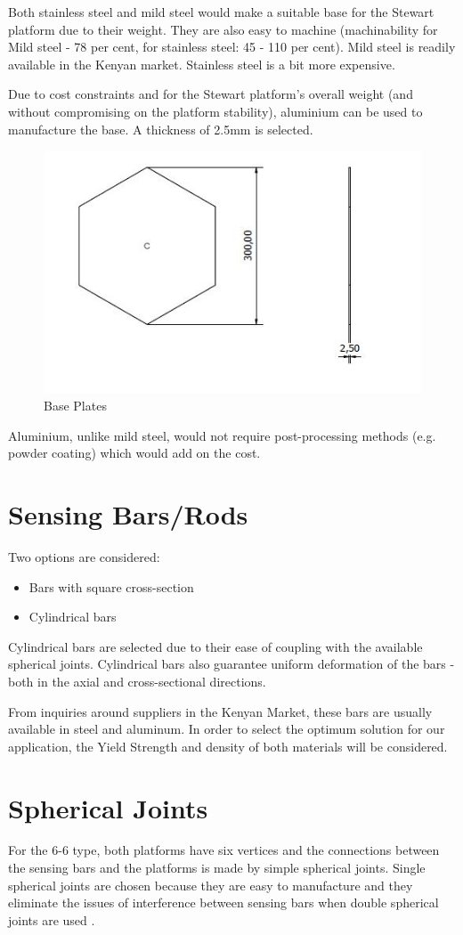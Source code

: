 Both stainless steel and mild steel would make a suitable base for the Stewart platform due to their weight. They are also easy to machine (machinability for Mild steel - 78 per cent, for stainless steel: 45 - 110 per cent). Mild steel is readily available in the Kenyan market. Stainless steel is a bit more expensive.

Due to cost constraints and for the Stewart platform's overall weight (and without compromising on the platform stability), aluminium can be used to manufacture the base. A thickness of 2.5mm is selected.
\begin{center}
	\begin{figure}[!h]
	\centering
	\includegraphics[width=0.6\linewidth]{Figures/Base}
	\caption[Base Plates]{Base Plates}
	\end{figure}
\end{center}
Aluminium, unlike mild steel, would not require post-processing methods (e.g. powder coating) which would add on the cost.
\section{Sensing Bars/Rods}
Two options are considered:
\begin{itemize}
\item Bars with square cross-section
\item Cylindrical bars
\end{itemize}
Cylindrical bars are selected due to their ease of coupling with the available spherical joints. Cylindrical bars also guarantee uniform deformation of the bars - both in the axial and cross-sectional directions.

From inquiries around suppliers in the Kenyan Market, these bars are usually available in steel and aluminum. In order to select the optimum solution for our application, the Yield Strength and density of both materials will be considered. 

\section{Spherical Joints}
For the 6-6 type, both platforms have six vertices and
the connections between the sensing bars and the platforms is made by simple spherical joints. Single spherical joints are chosen because they are easy to manufacture and they eliminate the issues of interference between sensing bars when double spherical joints are used \cite{fernandes_design_nodate}. 

